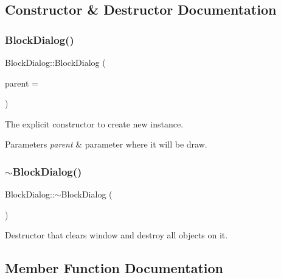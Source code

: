 \subsection{Constructor \& Destructor Documentation}
\mbox{\label{classBlockDialog_ab73c3fae34eb587bee67c0b67974c97e}} 
\subsubsection{\texorpdfstring{Block\+Dialog()}{BlockDialog()}}
{\footnotesize\ttfamily Block\+Dialog\+::\+Block\+Dialog (\begin{DoxyParamCaption}\item[{Q\+Widget $\ast$}]{parent = {} }\end{DoxyParamCaption})\hspace{0.3cm}{\ttfamily [explicit]}}

The explicit constructor to create new instance.


\begin{DoxyParams}{Parameters}
{\em parent} & parameter where it will be draw. \\
\hline
\end{DoxyParams}
\mbox{\label{classBlockDialog_a7a524e7d75f6b0c0addb855de52d713f}} 
\subsubsection{\texorpdfstring{$\sim$\+Block\+Dialog()}{~BlockDialog()}}
{\footnotesize\ttfamily Block\+Dialog\+::$\sim$\+Block\+Dialog (\begin{DoxyParamCaption}{ }\end{DoxyParamCaption})}

Destructor that clears window and destroy all objects on it. 

\subsection{Member Function Documentation}
\mbox{\label{classBlockDialog_ad8f20cab9c17a9a03d846a10215c55c5}} 
